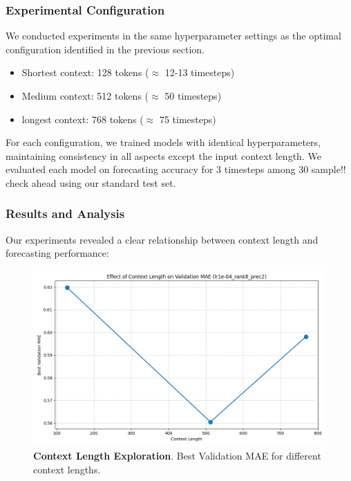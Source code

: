 \documentclass{article}
\begin{document}
\subsubsection*{Experimental Configuration}
We conducted experiments in the same hyperparameter settings as the optimal configuration identified in the previous section.
\begin{itemize}
    \item Shortest context: 128 tokens ($\approx$ 12-13 timesteps)
    \item Medium context: 512 tokens ($\approx$ 50 timesteps)
    \item longest context: 768 tokens ($\approx$ 75 timesteps)
\end{itemize}
For each configuration, we trained models with identical hyperparameters, maintaining consistency in all aspects except the input context length. We evaluated each model on forecasting accuracy for 3 timesteps among 30 sample!! check ahead using our standard test set.

\subsubsection*{Results and Analysis}
Our experiments revealed a clear relationship between context length and forecasting performance:
\begin{figure} [H]
    \centering
    \begin{minipage}{0.48\textwidth}
        \centering
        \includegraphics[width=\textwidth]{context_length}
    \end{minipage}
    \caption{\textbf{Context Length Exploration}. Best Validation MAE for different context lengths.}
    \label{fig:context_length}
\end{figure}
\end{document}
